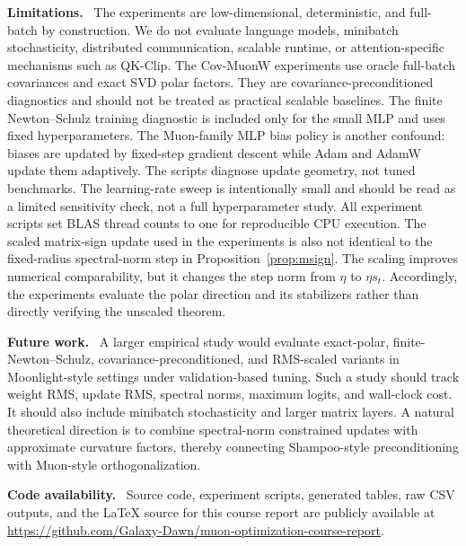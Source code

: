 \documentclass[sigconf,nonacm]{acmart}
\newcommand{\vpara}[1]{\par\noindent\textbf{#1.}\ }
\begin{document}
\vpara{Limitations} The experiments are low-dimensional, deterministic, and full-batch by construction. We do not evaluate language models, minibatch stochasticity, distributed communication, scalable runtime, or attention-specific mechanisms such as QK-Clip. The Cov-MuonW experiments use oracle full-batch covariances and exact SVD polar factors. They are covariance-preconditioned diagnostics and should not be treated as practical scalable baselines. The finite Newton--Schulz training diagnostic is included only for the small MLP and uses fixed hyperparameters. The Muon-family MLP bias policy is another confound: biases are updated by fixed-step gradient descent while Adam and AdamW update them adaptively. The scripts diagnose update geometry, not tuned benchmarks. The learning-rate sweep is intentionally small and should be read as a limited sensitivity check, not a full hyperparameter study. All experiment scripts set BLAS thread counts to one for reproducible CPU execution. The scaled matrix-sign update used in the experiments is also not identical to the fixed-radius spectral-norm step in Proposition~\ref{prop:msign}. The scaling improves numerical comparability, but it changes the step norm from $\eta$ to $\eta s_t$. Accordingly, the experiments evaluate the polar direction and its stabilizers rather than directly verifying the unscaled theorem.

\vpara{Future work} A larger empirical study would evaluate exact-polar, finite-Newton--Schulz, covariance-preconditioned, and RMS-scaled variants in Moonlight-style settings under validation-based tuning. Such a study should track weight RMS, update RMS, spectral norms, maximum logits, and wall-clock cost. It should also include minibatch stochasticity and larger matrix layers. A natural theoretical direction is to combine spectral-norm constrained updates with approximate curvature factors, thereby connecting Shampoo-style preconditioning with Muon-style orthogonalization.

\vpara{Code availability} Source code, experiment scripts, generated tables, raw CSV outputs, and the LaTeX source for this course report are publicly available at \url{https://github.com/Galaxy-Dawn/muon-optimization-course-report}.
\end{document}
